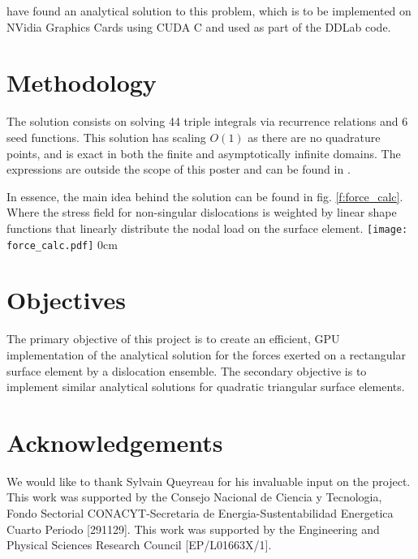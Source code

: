 \begin{multicols}{2}
{		\citet{analytical_integration_of_the_forces_induced_by_dislocations_on_a_surface_element} have found an analytical solution to this problem, which is to be implemented on NVidia Graphics Cards using CUDA C and used as part of the DDLab code.
		\section{Methodology}
		The solution consists on solving 44 triple integrals via recurrence relations and 6 seed functions. This solution has scaling $ O(1) $ as there are no quadrature points, and is exact in both the finite and asymptotically infinite domains. The expressions are outside the scope of this poster and can be found in \cite{analytical_integration_of_the_forces_induced_by_dislocations_on_a_surface_element}.

		In essence, the main idea behind the solution can be found in fig. \ref{f:force_calc}. Where the stress field for non-singular dislocations \cite{a_non-singular_continuum_theory_of_dislocations} is weighted by linear shape functions that linearly distribute the nodal load on the surface element.
		{%
			\texttt{[image: force\_calc.pdf]}
			\label{f:force_calc}
		}{0cm}
		\section{Objectives}
		The primary objective of this project is to create an efficient, GPU implementation of the analytical solution for the forces exerted on a rectangular surface element by a dislocation ensemble. The secondary objective is to implement similar analytical solutions for quadratic triangular surface elements.
		\section{Acknowledgements}
		We would like to thank Sylvain Queyreau for his invaluable input on the project. This work was supported by the Consejo Nacional de Ciencia y Tecnologia, Fondo Sectorial CONACYT-Secretaria de Energia-Sustentabilidad Energetica Cuarto Periodo [291129]. This work was supported by the Engineering and Physical Sciences Research Council [EP/L01663X/1].
	}
	
	
\end{multicols}
